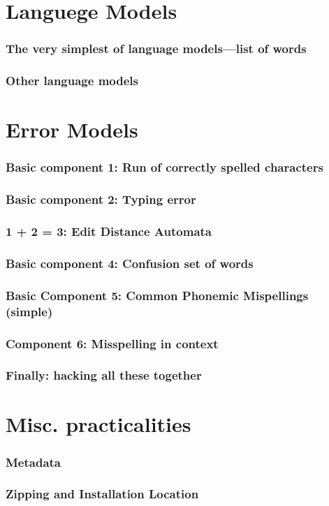 \documentclass[t,12pt,pdftex]{beamer}
\begin{document}
\section{Languege Models}

\begin{frame}
    \frametitle{The very simplest of language models---list of words}
    
\end{frame}

\begin{frame}
    \frametitle{Other language models}
\end{frame}

\section{Error Models}

\begin{frame}
    \frametitle{Basic component 1: Run of correctly spelled characters}
\end{frame}

\begin{frame}
    \frametitle{Basic component 2: Typing error}
\end{frame}

\begin{frame}
    \frametitle{1 + 2 = 3: Edit Distance Automata}
\end{frame}

\begin{frame}
    \frametitle{Basic component 4: Confusion set of words}
\end{frame}

\begin{frame}
    \frametitle{Basic Component 5: Common Phonemic Mispellings (simple)}
\end{frame}

\begin{frame}
    \frametitle{Component 6: Misspelling in context}
\end{frame}

\begin{frame}
    \frametitle{Finally: hacking all these together}

\end{frame}

\section{Misc. practicalities}

\begin{frame}
    \frametitle{Metadata}

\end{frame}

\begin{frame}
    \frametitle{Zipping and Installation Location}

\end{frame}
\end{document}
